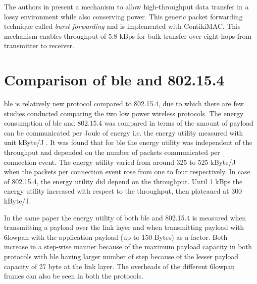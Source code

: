 The authors in \cite{Duquennoy2011} present a mechanism to allow high-throughput data transfer in a lossy environment while also conserving power. This generic packet forwarding technique called \emph{burst forwarding} and is implemented with ContikiMAC. This mechanism enables throughput of 5.8 kBps for bulk transfer over eight hops from transmitter to receiver. 




\section{Comparison of \texorpdfstring{\gls{ble}}{BLE} and 802.15.4} \label{4ble802}

\gls{ble} is relatively new protocol compared to 802.15.4, due to which there are few studies conducted comparing the two low power wireless protocols. The energy consumption of \gls{ble} and 802.15.4 was compared in terms of the amount of payload can be communicated per Joule of energy i.e. the energy utility measured with unit kByte/J  \cite{Siekkinen2012}. It was found that for \gls{ble} the energy utility was independent of the throughput and depended on the number of packets communicated per connection event. The energy utility varied from around 325 to 525 kByte/J when the packets per connection event rose from one to four respectively. In case of 802.15.4, the energy utility did depend on the throughput. Until 1 kBps the energy utility increased with respect to the throughput, then plateaued at 300 kByte/J. 

In the same paper  \cite{Siekkinen2012} the energy utility of both \gls{ble} and 802.15.4 is measured when transmitting a payload over the link layer and when transmitting payload with \gls{6lowpan} with the application payload (up to 150 Bytes) as a factor. Both increase in a step-wise manner because of the maximum payload capacity in both protocols with \gls{ble} having larger number of step because of the lesser payload capacity of 27 byte at the link layer. The overheads of the different \gls{6lowpan} frames can also be seen in both the protocols. 

